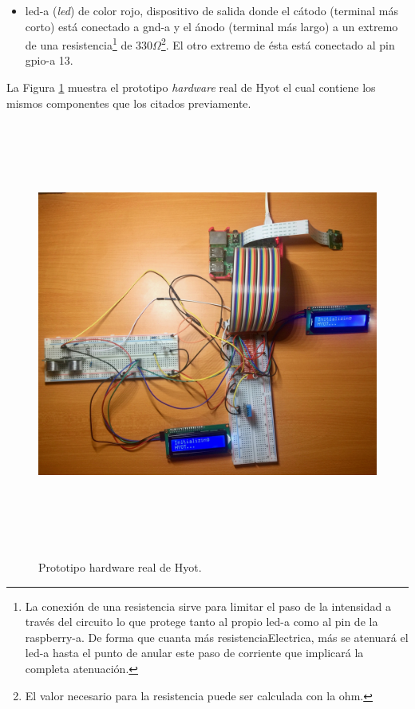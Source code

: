 \documentclass[12pt,a4paper, twoside]{report}
\begin{document}
\begin{itemize}
		\item \gls{led-a} (\textit{\gls{led}}) de color rojo, dispositivo de salida donde el cátodo (terminal más corto) está conectado a \gls{gnd-a} y el ánodo (terminal más largo) a un extremo de una \gls{resistencia}\footnote{La conexión de una \gls{resistencia} sirve para limitar el paso de la \gls{intensidad} a través del circuito lo que protege tanto al propio \gls{led-a} como al pin de la \gls{raspberry-a}. De forma que cuanta más \gls{resistenciaElectrica}, más se atenuará el \gls{led-a} hasta el punto de anular este paso de corriente que implicará la completa atenuación.} de 330$\Omega$\footnote{El valor necesario para la \gls{resistencia} puede ser calculada con la \gls{ohm}.}. El otro extremo de ésta está conectado al pin \gls{gpio-a} 13.					
	\end{itemize}	
	
	La Figura \ref{fig:annexe_realprototype} muestra el \gls{prototipo} \textit{hardware} real de Hyot el cual contiene los mismos componentes que los citados previamente.
	
		\begin{figure}[!ht]   
			\caption{Prototipo hardware real de Hyot.} 
			\begin{center} 
		 		\includegraphics[width=18cm,height=14cm]{Images/prototype/real_prototype} \\
				\label{fig:annexe_realprototype} 
			\end{center}  
		\end{figure}  
		
\end{document}
